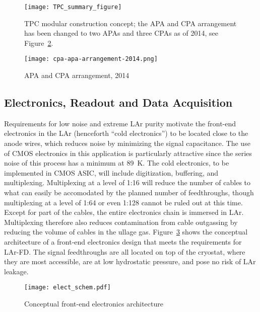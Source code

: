 \begin{figure}[htbp]
\centering
\texttt{[image: TPC\_summary\_figure]}
\caption{TPC modular construction concept; the APA and CPA arrangement has been changed to two APAs and three CPAs as of 2014, see Figure~\ref{fig:cpa-apa-arrangement-2014}.}
\label{fig:tpc-concept}
\end{figure}

\begin{figure}[htbp]
\centering
\texttt{[image: cpa-apa-arrangement-2014.png]}
\caption{APA and CPA arrangement, 2014}
\label{fig:cpa-apa-arrangement-2014}
\end{figure}


\subsection{Electronics, Readout and Data Acquisition}
\label{sec:det_electronics}

Requirements for low noise and extreme LAr purity motivate
the front-end electronics in the LAr (henceforth ``cold electronics'') to be located close to the anode wires,
which reduces noise by minimizing the signal capacitance.
The use of CMOS electronics in this application is particularly attractive
since the series noise of this process has a minimum at 89~K.
The cold electronics, to be implemented in CMOS ASIC, will include digitization, buffering, and multiplexing.
Multiplexing at a level of 1:16 will reduce the number of cables to what can easily be accomodated
by the planned number of feedthroughs, though multiplexing at a level of 1:64 or even 1:128 cannot be ruled out at this time.
Except for part of the cables, the entire electronics chain is immersed in LAr.
Multiplexing therefore also reduces contamination from cable outgassing by reducing the volume of cables in the ullage gas.
Figure~\ref{fig:elect_schem} shows the conceptual architecture of a front-end electronics design
that meets the requirements for LAr-FD.
The signal feedthroughs are all located on top of the cryostat, where they are most accessible,
are at low hydrostatic pressure, and pose no risk of LAr leakage.

\begin{figure}[htbp]
\centering
\texttt{[image: elect\_schem.pdf]}
\caption{Conceptual front-end electronics architecture}
\label{fig:elect_schem}
\end{figure}



